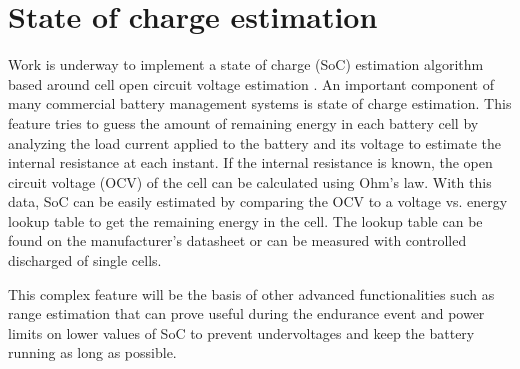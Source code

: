 \section{State of charge estimation}
Work is underway to implement a state of charge (SoC) estimation algorithm based around cell open circuit voltage estimation \cite{soc}.
An important component of many commercial battery management systems is state of charge estimation. This feature tries to guess the amount of remaining energy in each battery cell by analyzing the load current applied to the battery and its voltage to estimate the internal resistance at each instant. If the internal resistance is known, the open circuit voltage (OCV) of the cell can be calculated using Ohm's law. With this data, SoC can be easily estimated by comparing the OCV to a voltage vs. energy lookup table to get the remaining energy in the cell. The lookup table can be found on the manufacturer's datasheet or can be measured with controlled discharged of single cells.

This complex feature will be the basis of other advanced functionalities such as range estimation that can prove useful during the endurance event and power limits on lower values of SoC to prevent undervoltages and keep the battery running as long as possible.

